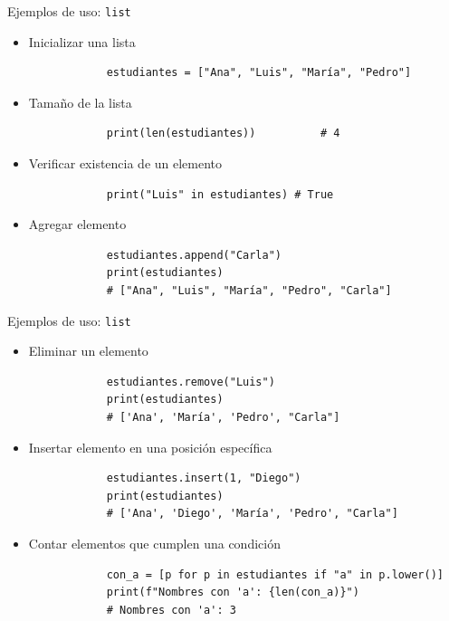 \documentclass{beamer}
\begin{document}
    \begin{frame}[fragile, t]{Ejemplos de uso: \texttt{list}}
        \begin{itemize}
            \item Inicializar una lista
            \begin{verbatim}
            estudiantes = ["Ana", "Luis", "María", "Pedro"]
            \end{verbatim}
            \item Tamaño de la lista
            \begin{verbatim}
            print(len(estudiantes))          # 4
            \end{verbatim}
            \item Verificar existencia de un elemento
            \begin{verbatim}
            print("Luis" in estudiantes) # True
            \end{verbatim}
            \item Agregar elemento
            \begin{verbatim}
            estudiantes.append("Carla")
            print(estudiantes)
            # ["Ana", "Luis", "María", "Pedro", "Carla"]
            \end{verbatim}
        \end{itemize}
    \end{frame}

    \begin{frame}[fragile, t]{Ejemplos de uso: \texttt{list}}
        \begin{itemize}
            \item Eliminar un elemento
            \begin{verbatim}
            estudiantes.remove("Luis")
            print(estudiantes)
            # ['Ana', 'María', 'Pedro', "Carla"]
            \end{verbatim}
            \item Insertar elemento en una posición específica
            \begin{verbatim}
            estudiantes.insert(1, "Diego")
            print(estudiantes)
            # ['Ana', 'Diego', 'María', 'Pedro', "Carla"]
            \end{verbatim}
            \item Contar elementos que cumplen una condición
            \begin{verbatim}
            con_a = [p for p in estudiantes if "a" in p.lower()]
            print(f"Nombres con 'a': {len(con_a)}")
            # Nombres con 'a': 3
            \end{verbatim}
        \end{itemize}
    \end{frame}
\end{document}
